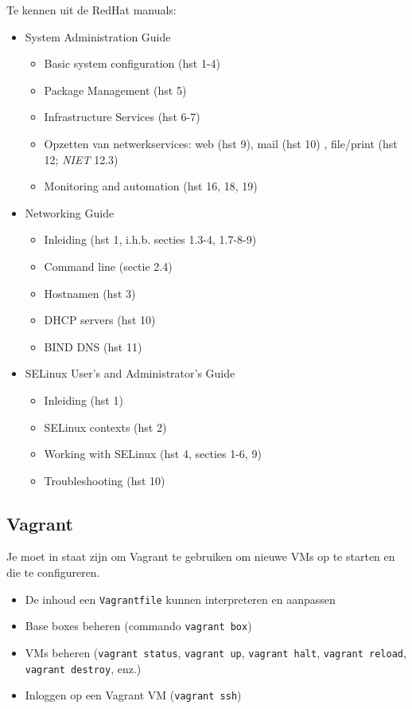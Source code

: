 Te kennen uit de RedHat manuals:

\begin{itemize}
\item System Administration Guide~\autocite{SvistunovEtAl2016}

  \begin{itemize}
  \item Basic system configuration (hst 1-4)
  \item Package Management (hst 5)
  \item Infrastructure Services (hst 6-7)
  \item Opzetten van netwerkservices: web (hst 9), mail (hst 10) , file/print (hst 12; \emph{NIET} 12.3)
  \item Monitoring and automation (hst 16, 18, 19)
  \end{itemize}

\item Networking Guide~\autocite{JahodaEtAl2016}

  \begin{itemize}
  \item Inleiding (hst 1, i.h.b. secties 1.3-4, 1.7-8-9)
  \item Command line (sectie 2.4)
  \item Hostnamen (hst 3)
  \item DHCP servers (hst 10)
  \item BIND DNS (hst 11)
  \end{itemize}
\item
  SELinux User's and Administrator's Guide~\autocite{JahodaEtAl2016a}

  \begin{itemize}
  \item Inleiding (hst 1)
  \item SELinux contexts (hst 2)
  \item Working with SELinux (hst 4, secties 1-6, 9)
  \item Troubleshooting (hst 10)
  \end{itemize}
\end{itemize}

\subsection{Vagrant}
\label{subs:vagrant}

Je moet in staat zijn om Vagrant te gebruiken om nieuwe VMs op te starten en die te configureren.

\begin{itemize}
\item De inhoud een \texttt{Vagrantfile} kunnen interpreteren en aanpassen
\item Base boxes beheren (commando \texttt{vagrant\ box})
\item VMs beheren (\texttt{vagrant\ status}, \texttt{vagrant\ up}, \texttt{vagrant\ halt}, \texttt{vagrant\ reload}, \texttt{vagrant\ destroy}, enz.)
\item Inloggen op een Vagrant VM (\texttt{vagrant\ ssh})
\end{itemize}

